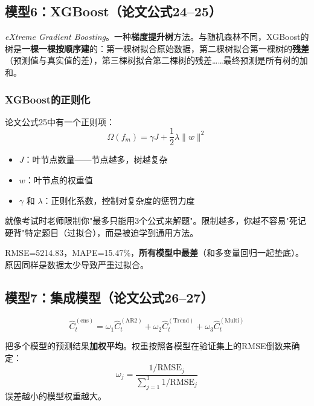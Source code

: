 \documentclass[12pt, a4paper]{article}
\begin{document}
\subsection{模型6：XGBoost（论文公式24--25）}

\begin{conceptbox}[XGBoost]
\textit{eXtreme Gradient Boosting}。一种\textbf{梯度提升树}方法。与随机森林不同，XGBoost的树是\textbf{一棵一棵按顺序建}的：第一棵树拟合原始数据，第二棵树拟合第一棵树的\textbf{残差}（预测值与真实值的差），第三棵树拟合第二棵树的残差……最终预测是所有树的加和。
\end{conceptbox}

\subsubsection{XGBoost的正则化}

论文公式25中有一个正则项：
\[
\Omega(f_m) = \gamma J + \frac{1}{2}\lambda \|w\|^2
\]
\begin{itemize}[leftmargin=2em]
\item $J$：叶节点数量——节点越多，树越复杂
\item $w$：叶节点的权重值
\item $\gamma$ 和 $\lambda$：正则化系数，控制对复杂度的惩罚力度
\end{itemize}

\begin{tipbox}[正则化的直觉]
就像考试时老师限制你"最多只能用3个公式来解题"。限制越多，你越不容易"死记硬背"特定题目（过拟合），而是被迫学到通用方法。
\end{tipbox}

\begin{warningbox}[XGBoost在论文中的表现]
RMSE=5214.83，MAPE=15.47\%，\textbf{所有模型中最差}（和多变量回归一起垫底）。原因同样是数据太少导致严重过拟合。
\end{warningbox}

\subsection{模型7：集成模型（论文公式26--27）}

\[
\hat{C}_t^{(\text{ens})} = \omega_1 \hat{C}_t^{(\text{AR2})} + \omega_2 \hat{C}_t^{(\text{Trend})} + \omega_3 \hat{C}_t^{(\text{Multi})}
\]

\begin{conceptbox}[集成模型]
把多个模型的预测结果\textbf{加权平均}。权重按照各模型在验证集上的RMSE倒数来确定：
\[
\omega_j = \frac{1/\text{RMSE}_j}{\sum_{j=1}^{3} 1/\text{RMSE}_j}
\]
误差越小的模型权重越大。
\end{conceptbox}
\end{document}
